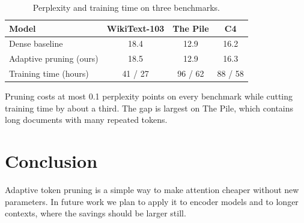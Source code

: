 \documentclass[11pt]{article}
\begin{document}
\begin{table}[!htb]
\centering
\caption{Perplexity and training time on three benchmarks.}
\label{tab:main}
\begin{tabular}{lccc}
\toprule
Model & WikiText-103 & The Pile & C4 \\
\midrule
Dense baseline & 18.4 & 12.9 & 16.2 \\
Adaptive pruning (ours) & 18.5 & 12.9 & 16.3 \\
\midrule
Training time (hours) & 41 / 27 & 96 / 62 & 88 / 58 \\
\bottomrule
\end{tabular}
\end{table}

Pruning costs at most 0.1 perplexity points on every benchmark while cutting training time by about
a third. The gap is largest on The Pile, which contains long documents with many repeated tokens.

\section{Conclusion}
Adaptive token pruning is a simple way to make attention cheaper without new parameters. In future work
we plan to apply it to encoder models and to longer contexts, where the savings should be larger still.
\end{document}
